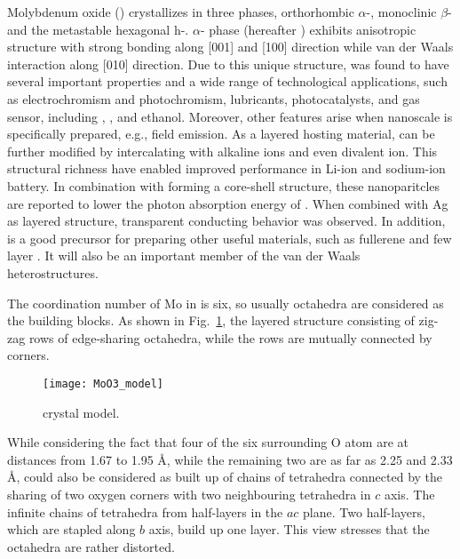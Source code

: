 Molybdenum oxide () crystallizes in three phases, orthorhombic $\alpha$-, monoclinic $\beta$- and the metastable hexagonal h-.\citep{Deb1968,Fibers2007} $\alpha$- phase (hereafter ) exhibits anisotropic structure with strong bonding along [001] and [100] direction while van der Waals interaction along [010] direction.\cite{He2003} Due to this unique structure,  was found to have several important properties and a wide range of technological applications, such as electrochromism and photochromism,\cite{Yao1992} lubricants,\cite{Sheehan1996} photocatalysts,\cite{Chen2010} and gas sensor, including ,\cite{Comini2005} ,\cite{Taurino2006} \cite{Sha2009} and ethanol.\cite{Choopun} Moreover, other features arise when nanoscale  is specifically prepared, e.g., field emission.\citep{Li2002d,Zhou2003b}  As a layered hosting material,  can be further modified by intercalating with alkaline ions\citep{Spahr1995,Li2006b,Hu2011} and even divalent ion.\cite{Sian2005} This structural richness have enabled improved performance in Li-ion\cite{Mai2007} and sodium-ion battery.\cite{Hariharan2013} In combination with  forming a core-shell structure, these nanoparitcles are reported to lower the photon absorption energy of .\cite{Elder2000} When combined with Ag as layered structure, transparent conducting behavior was observed.\cite{Nguyen2012} In addition,  is a good precursor for preparing other useful materials, such as  fullerene\cite{Li2003c} and few layer .\cite{Lin2012} It will also be an important member of the van der Waals heterostructures.\cite{Geim2013}

The coordination number of Mo in  is six, so usually  octahedra are considered as the building blocks. As shown in Fig.~\ref{fig:mo3model}, the layered structure consisting of zig-zag rows of edge-sharing  octahedra, while the rows are mutually connected by corners.
\begin{figure}[ht]
\centering
\texttt{[image: MoO3\_model]}
\caption[ crystal model]{ crystal model.}
\label{fig:mo3model}
\end{figure}
While considering the fact that four of the six surrounding O atom are at distances from 1.67 to 1.95 \AA, while the remaining two are as far as 2.25 and 2.33 \AA,  could also be considered as built up of chains of  tetrahedra connected by the sharing of two oxygen corners with two neighbouring tetrahedra in $c$ axis. The infinite chains of  tetrahedra from half-layers in the $ac$ plane. Two half-layers, which are stapled along $b$ axis, build up one  layer.\cite{Itoh2001a} This view stresses that the  octahedra are rather distorted.

